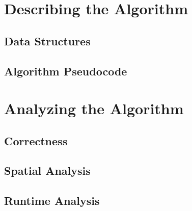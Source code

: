 \documentclass[twoside]{article}
\begin{document}
\begin{multicols}{2}
\section{Describing the Algorithm}


\lipsum[1]

\subsection{Data Structures}
\lipsum[2-3] %

\subsection{Algorithm Pseudocode} 

\lipsum[4] %


\section{Analyzing the Algorithm}

\lipsum[1]

\subsection{Correctness}

\lipsum[2-3]

\subsection{Spatial Analysis}

\lipsum[2-3]

\subsection{Runtime Analysis}

\lipsum[2-3]



\end{multicols}
\end{document}
